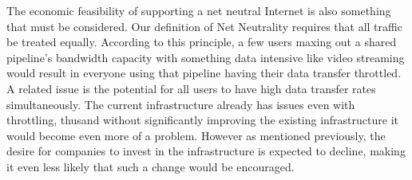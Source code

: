 \documentclass{sigcomm-alternate}
\begin{document}
The economic feasibility of supporting a net neutral Internet is also something that must be considered. Our definition of Net Neutrality requires that all traffic be treated equally. According to this principle, a few users maxing out a shared pipeline’s bandwidth capacity with something data intensive like video streaming would result in everyone using that pipeline having their data transfer throttled. A related issue is the potential for all users to have high data transfer rates simultaneously. The current infrastructure already has issues even with throttling, thusand without significantly improving the existing infrastructure it would become even more of a problem. However as mentioned previously, the desire for companies to invest in the infrastructure is expected to decline, making it even less likely that such a change would be encouraged.



\end{document}
